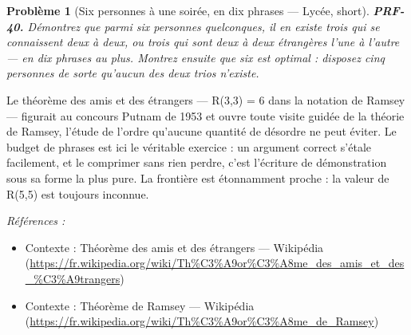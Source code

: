\documentclass[11pt]{article}
\newtheorem{problem}{Problème}
\newenvironment{refs}{\par\small\noindent\emph{Références :}\begin{itemize}\setlength\itemsep{0pt}}{\end{itemize}\normalsize}
\begin{document}
\bigskip

\begin{problem}[{Six personnes à une soirée, en dix phrases --- Lycée, short}]
\textbf{PRF-40.} Démontrez que parmi six personnes quelconques, il en
existe trois qui se connaissent deux à deux, ou trois qui sont deux à deux étrangères l'une
à l'autre --- en dix phrases au plus. Montrez ensuite que six est optimal : disposez cinq
personnes de sorte qu'aucun des deux trios n'existe.
\end{problem}

\noindent Le théorème des amis et des étrangers --- R(3,3) = 6 dans la notation de
Ramsey --- figurait au concours Putnam de 1953 et ouvre toute visite guidée de la théorie de
Ramsey, l'étude de l'ordre qu'aucune quantité de désordre ne peut éviter. Le budget de
phrases est ici le véritable exercice : un argument correct s'étale facilement, et le
comprimer sans rien perdre, c'est l'écriture de démonstration sous sa forme la plus pure. La
frontière est étonnamment proche : la valeur de R(5,5) est toujours inconnue.

\begin{refs}
\item Contexte : Théorème des amis et des étrangers --- Wikipédia (\url{https://fr.wikipedia.org/wiki/Th%C3%A9or%C3%A8me_des_amis_et_des_%C3%A9trangers})
\item Contexte : Théorème de Ramsey --- Wikipédia (\url{https://fr.wikipedia.org/wiki/Th%C3%A9or%C3%A8me_de_Ramsey})
\end{refs}

\bigskip
\end{document}
